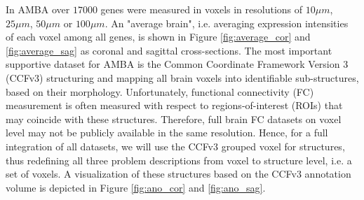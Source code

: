 \documentclass[]{article}
\renewcommand{\cite}{\citep}
\begin{document}
In AMBA over $17000$ genes were measured in voxels in resolutions of $10\mu m$, $25\mu m$, $50\mu m$ or $100\mu m$. An "average brain", i.e. averaging expression intensities of each voxel among all genes, is shown in Figure \ref{fig:average_cor} and \ref{fig:average_sag} as coronal and sagittal cross-sections.
The most important supportive dataset for AMBA is the Common Coordinate Framework Version 3 (CCFv3)\cite{wang2020allen} structuring  and mapping all brain voxels into identifiable sub-structures, based on their morphology. Unfortunately, functional connectivity (FC) measurement is often measured with respect to regions-of-interest (ROIs) that may coincide with these structures. Therefore, full brain FC datasets on voxel level may not be publicly available in the same resolution. Hence, for a full integration of all datasets, we will use the CCFv3 grouped voxel for structures, thus redefining all three problem descriptions from voxel to structure level, i.e. a set of voxels. A visualization of these structures based on the CCFv3 annotation volume is depicted in Figure \ref{fig:ano_cor} and \ref{fig:ano_sag}.\\
\end{document}
